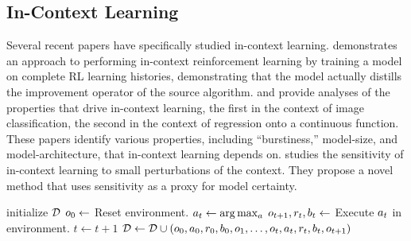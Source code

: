 \documentclass{article}
\begin{document}
\subsection{In-Context Learning}
Several recent papers have specifically studied in-context learning.
\cite{laskin2022context} demonstrates an approach to performing in-context
reinforcement learning by training a model on complete RL learning histories,
demonstrating that the model actually distills the improvement operator of the
source algorithm.
\cite{chan_data_2022} and
\cite{garg_what_2022} provide analyses of the properties that drive in-context
learning, the first in the context of image classification, the second in the
context of regression onto a continuous function. These papers identify various
properties, including ``burstiness,'' model-size, and model-architecture, that
in-context learning depends on. \cite{chen_relation_2022} studies the
sensitivity of in-context learning to small perturbations of the context. They
propose a novel method that uses sensitivity as a proxy for model certainty.
\begin{algorithm}[b]
  \caption{Training Loop}
  \label{algo:train}
  \begin{algorithmic}[1]
    \State initialize $\mathcal{D}$
    \State $\Obs_0 \gets$ Reset environment.
    \State $\Act_t \gets \argmax_{a}$ 
    \State $\Obs_{t+1}, \Rew_t, \Ter_t \gets$ Execute $\Act_t$ in environment.
    \State $t \gets t + 1$
    \EndWhile
    \State $\Buffer \gets \Buffer \cup
      \left(
      \Obs_0, \Act_0, \Rew_0, \Ter_0, \Obs_1, \dots,
      \Obs_t, \Act_t, \Rew_t, \Ter_t, \Obs_{t+1}
      \right)$
    \EndWhile
    \EndFunction
  \end{algorithmic}
\end{algorithm}
\end{document}
